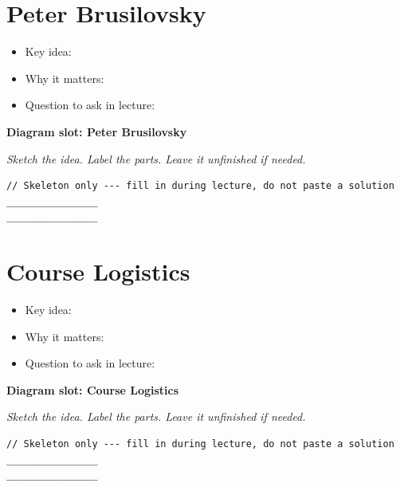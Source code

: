 \documentclass[12pt]{article}
\begin{document}
\section{Peter Brusilovsky}
\begin{itemize}[leftmargin=*]
  \item Key idea: \hrulefill
  \vspace{1.1em}
  \item Why it matters: \hrulefill
  \vspace{1.1em}
  \item Question to ask in lecture: \hrulefill
\end{itemize}
\noindent\textbf{Diagram slot: Peter Brusilovsky}
\begin{framed}
\begin{minipage}[t][0.22\textheight]{\textwidth}
\vspace{0.4em}
\textit{Sketch the idea. Label the parts. Leave it unfinished if needed.}
\end{minipage}
\end{framed}
\vspace{1em}
\begin{lstlisting}
// Skeleton only --- fill in during lecture, do not paste a solution
________________
________________
\end{lstlisting}
\vspace{1em}
\section{Course Logistics}
\begin{itemize}[leftmargin=*]
  \item Key idea: \hrulefill
  \vspace{1.1em}
  \item Why it matters: \hrulefill
  \vspace{1.1em}
  \item Question to ask in lecture: \hrulefill
\end{itemize}
\noindent\textbf{Diagram slot: Course Logistics}
\begin{framed}
\begin{minipage}[t][0.22\textheight]{\textwidth}
\vspace{0.4em}
\textit{Sketch the idea. Label the parts. Leave it unfinished if needed.}
\end{minipage}
\end{framed}
\vspace{1em}
\begin{lstlisting}
// Skeleton only --- fill in during lecture, do not paste a solution
________________
________________
\end{lstlisting}
\vspace{1em}
\end{document}
